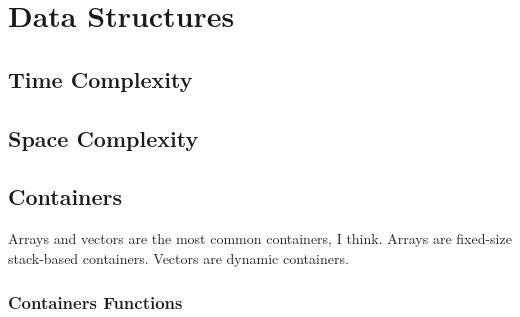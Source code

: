 

\chapter{Data Structures}


\section{Time Complexity}

\section{Space Complexity}



\section{Containers}

Arrays and vectors are the most common containers, I think. Arrays are fixed-size stack-based containers. Vectors
are dynamic containers.

\subsection{Containers Functions}

